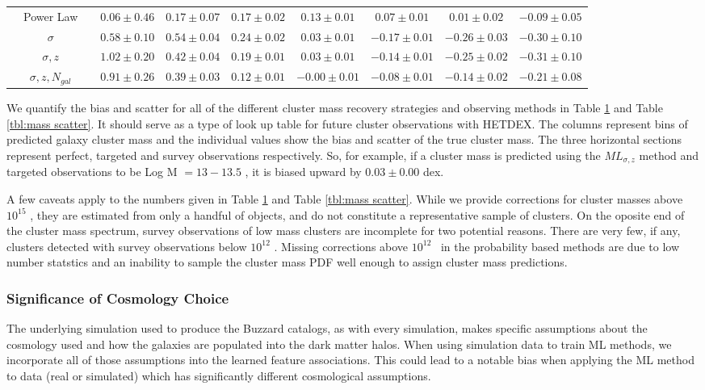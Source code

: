 \documentclass[fleqn,usenatbib]{mnras}
\newcommand{\rottext}[2]{\multirow{#1}{*}{\rotatebox[origin=c]{90}{#2}}}
\begin{document}
\begin{table}
\begin{tabular}{cccccccccc}
		\hline
		\rottext{4}{ML Based} & Power Law & \nd & $0.06\pm{0.46}$ & $0.17\pm{0.07}$ & $0.17\pm{0.02}$ & $0.13\pm{0.01}$ & $0.07\pm{0.01}$ & $0.01\pm{0.02}$ & $-0.09\pm{0.05}$ \\
		&$\sigma$ & \nd & $0.58\pm{0.10}$ & $0.54\pm{0.04}$ & $0.24\pm{0.02}$ & $0.03\pm{0.01}$ & $-0.17\pm{0.01}$ & $-0.26\pm{0.03}$ & $-0.30\pm{0.10}$ \\
		&$\sigma, z$ & \nd & $1.02\pm{0.20}$ & $0.42\pm{0.04}$ & $0.19\pm{0.01}$ & $0.03\pm{0.01}$ & $-0.14\pm{0.01}$ & $-0.25\pm{0.02}$ & $-0.31\pm{0.10}$ \\
		&$\sigma, z, N_{gal}$ & \nd & $0.91\pm{0.26}$ & $0.39\pm{0.03}$ & $0.12\pm{0.01}$ & $-0.00\pm{0.01}$ & $-0.08\pm{0.01}$ & $-0.14\pm{0.02}$ & $-0.21\pm{0.08}$ \\
	\hline
	\end{tabular}
\label{tbl:mass bias}
\end{table}

We quantify the bias and scatter for all of the different cluster mass recovery strategies and observing methods in Table \ref{tbl:mass bias} and Table \ref{tbl:mass scatter}. It should serve as a type of look up table for future cluster observations with HETDEX. The columns represent bins of predicted galaxy cluster mass and the individual values show the bias and scatter of the true cluster mass. The three horizontal sections represent perfect, targeted and survey observations respectively. So, for example, if a cluster mass is predicted using the $ML_{\sigma, z}$ method and targeted observations to be Log M $=13-13.5$ \Msol, it is biased upward by $0.03\pm{0.00}$ dex. 

 A few caveats apply to the numbers given in Table \ref{tbl:mass bias} and Table \ref{tbl:mass scatter}. While we provide corrections for cluster masses above $10^{15}$ \msol, they are estimated from only a handful of objects, and do not constitute a representative sample of clusters. On the oposite end of the cluster mass spectrum, survey observations of low mass clusters are incomplete for two potential reasons. There are very few, if any, clusters detected with survey observations below $10^{12}$ \msol. Missing corrections above $10^{12}$ \msol\ in the probability based methods are due to low number statstics and an inability to sample the cluster mass PDF well enough to assign cluster mass predictions.
 
\subsubsection{Significance of Cosmology Choice}
The underlying simulation used to produce the Buzzard catalogs, as with every simulation, makes specific assumptions about the cosmology used and how the galaxies are populated into the dark matter halos. When using simulation data to train ML methods, we incorporate all of those assumptions into the learned feature associations. This could lead to a notable bias when applying the ML method to data (real or simulated) which has significantly different cosmological assumptions.
\end{document}
